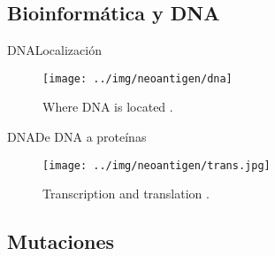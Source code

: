 \documentclass[10pt]{beamer}
\newcommand{\1}{
	\setbeamertemplate{background}{
		\texttt{[image: ../img/1]}
		\tikz[overlay] \fill[fill opacity=0.75,fill=white] (0,0) rectangle (-\paperwidth,\paperheight);
	}
}
\begin{document}
	\subsection{Bioinformática y DNA}
	

	
	\begin{frame}{DNA}{Localización}
		\begin{figure}[]
			\centering
			\texttt{[image: ../img/neoantigen/dna]}
			\label{img:mot2}
			\caption{Where DNA is located \cite{NCIdictionary2022}.}
		\end{figure}
	\end{frame}
	
	
	
	\begin{frame}{DNA}{De DNA a proteínas}
		\begin{figure}[]
			\centering
			\texttt{[image: ../img/neoantigen/trans.jpg]}
			\caption{Transcription and translation \cite{nci2020}.}
		\end{figure}
	\end{frame}
	
	\subsection{Mutaciones}
\end{document}
